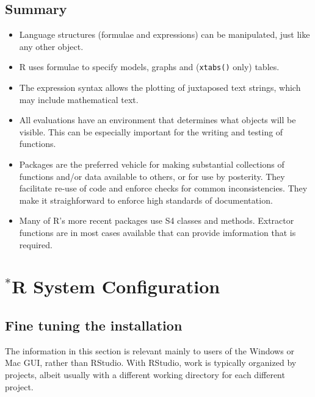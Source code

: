 \documentclass{tufte-book}\usepackage[]{graphicx}\usepackage[]{color}
\newcommand{\txtt}[1]{\texttt{#1}}
\begin{document}
\section{Summary}
\begin{itemize}
\item[] Language structures (formulae and expressions) can be manipulated,
just like any other object.

\item[] R uses formulae to specify models, graphs and (\txtt{xtabs()}
only) tables.

\item[] The expression syntax allows the plotting of juxtaposed text
strings, which may include mathematical text.

\item[] All evaluations have an environment that determines what
  objects will be visible. This can be especially important for the
writing and testing of functions.

\item[] Packages are the preferred vehicle for making substantial
  collections of functions and/or data available to others, or for use
  by posterity.  They facilitate re-use of code and enforce checks for
  common inconsistencies. They make it straighforward to enforce high
  standards of documentation.

\item[] Many of R's more recent packages use S4 classes and methods.
Extractor functions are in most cases available that can provide
imformation that is required.

\end{itemize}
% 
\cleartooddpage

\appendix

\chapter{$^*$R System Configuration}\label{ch:sys}





\section{Fine tuning the installation}\label{sec:fine-tune}
The information in this section is relevant mainly to users of the Windows
or Mac GUI, rather than RStudio.  With RStudio, work is typically
organized by projects, albeit usually with a different working
directory for each different project.
\end{document}
